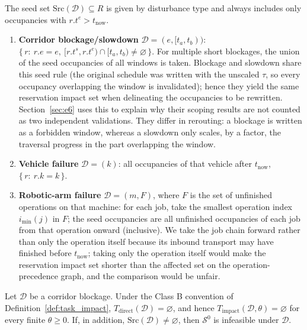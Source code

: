 \begin{definition}
\label{def:seeds}
The seed set \(\mathrm{Src}(\mathcal{D})\subseteq R\) is given by disturbance type and always includes only occupancies with
\(r.t^e>t_{\mathrm{now}}\).
\begin{enumerate}[label=(\alph*),leftmargin=1.6em,itemsep=0.15em]
\item \textbf{Corridor blockage/slowdown} \(\mathcal{D}=(e,[t_a,t_b))\):
\(\{\,r:\ r.e=e,\ [r.t^s,r.t^e)\cap[t_a,t_b)\neq\varnothing\,\}\).
For multiple short blockages, the union of the seed occupancies of all windows is taken. Blockage and slowdown share this seed rule (the original schedule was written with the unscaled \(\tau\),
so every occupancy overlapping the window is invalidated); hence they yield the same reservation impact set when delineating the occupancies to be rewritten. Section~\ref{sec:e6} uses this to explain
why their scoping results are not counted as two independent validations. They differ in rerouting: a blockage is written as a forbidden window,
whereas a slowdown only scales, by a factor, the traversal progress in the part overlapping the window.
\item \textbf{Vehicle failure} \(\mathcal{D}=(k)\): all occupancies of that vehicle after \(t_{\mathrm{now}}\),
\(\{\,r:\ r.k=k\,\}\).
\item \textbf{Robotic-arm failure} \(\mathcal{D}=(m,F)\), where \(F\) is the set of unfinished operations on that machine:
for each job, take the smallest operation index \(i_{\min}(j)\) in \(F\); the seed occupancies are all unfinished occupancies of each job from that operation onward (inclusive).
We take the job chain forward rather than only the operation itself because its inbound transport may have finished before
\(t_{\mathrm{now}}\); taking only the operation itself would make the reservation impact set shorter than the affected set on the operation-precedence graph, and the comparison would be unfair.
\end{enumerate}
\end{definition}

\begin{prop}
\label{prop:miss}
Let \(\mathcal{D}\) be a corridor blockage. Under the Class B convention of Definition~\ref{def:task_impact},
\(T_{\mathrm{direct}}(\mathcal{D})=\varnothing\), and hence \(T_{\mathrm{impact}}(\mathcal{D},\theta)=\varnothing\) for every finite \(\theta\ge 0\).
If, in addition, \(\mathrm{Src}(\mathcal{D})\neq\varnothing\), then \(\mathcal{S}^0\) is infeasible under \(\mathcal{D}\).
\end{prop}

